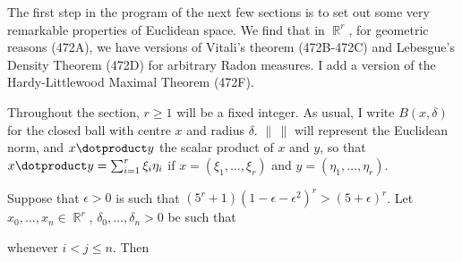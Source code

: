 
\def\chaptername{Geometric measure theory}
\def\sectionname{Besicovitch's Density Theorem}


The first step in the program of the next few sections
is to set out some very remarkable properties of
Euclidean space.   We find that in $\BbbR^r$, for geometric reasons
(472A), we have versions of Vitali's theorem (472B-472C) and Lebesgue's
Density Theorem (472D) for arbitrary Radon measures.   I add a version
of the Hardy-Littlewood Maximal Theorem (472F).

Throughout the section, $r\ge 1$ will be a fixed integer.   As usual, I
write $B(x,\delta)$ for the closed ball with centre $x$ and radius
$\delta$.   $\|\,\|$ will represent the Euclidean norm, and
$x\dotproduct y$ the scalar product of $x$ and $y$, so that
$x\dotproduct y=\sum_{i=1}^r\xi_i\eta_i$ if $x=(\xi_1,\ldots,\xi_r)$ and
$y=(\eta_1,\ldots,\eta_r)$.

 Suppose that $\epsilon>0$ is
such that $(5^r+1)(1-\epsilon-\epsilon^2)^r>(5+\epsilon)^r$.   Let
$x_0,\ldots,x_n\in\BbbR^r$, $\delta_0,\ldots,\delta_n>0$ be such that


\noindent whenever $i<j\le n$.   Then


